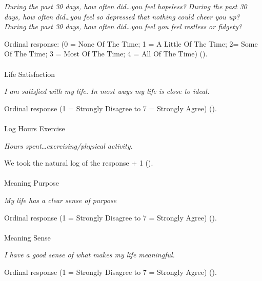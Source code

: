 \documentclass[
  single column]{article}
\makeatletter
\let\oldparagraph\paragraph
\renewcommand{\paragraph}{
    \@ifstar
      \xxxParagraphStar
      \xxxParagraphNoStar
  }
\newcommand{\xxxParagraphStar}[1]{\oldparagraph*{#1}\mbox{}}
\newcommand{\xxxParagraphNoStar}[1]{\oldparagraph{#1}\mbox{}}
\makeatother
\begin{document}
\emph{During the past 30 days, how often did\ldots you feel hopeless?}
\emph{During the past 30 days, how often did\ldots you feel so depressed
that nothing could cheer you up?} \emph{During the past 30 days, how
often did\ldots you feel you feel restless or fidgety?}

Ordinal response: (0 = None Of The Time; 1 = A Little Of The Time; 2=
Some Of The Time; 3 = Most Of The Time; 4 = All Of The Time)
().

\paragraph{Life Satisfaction}\label{life-satisfaction-1}

\emph{I am satisfied with my life.} \emph{In most ways my life is close
to ideal.}

Ordinal response (1 = Strongly Disagree to 7 = Strongly Agree)
().

\paragraph{Log Hours Exercise}\label{log-hours-exercise}

\emph{Hours spent\ldots exercising/physical activity.}

We took the natural log of the response + 1
().

\paragraph{Meaning Purpose}\label{meaning-purpose}

\emph{My life has a clear sense of purpose}

Ordinal response (1 = Strongly Disagree to 7 = Strongly Agree)
().

\paragraph{Meaning Sense}\label{meaning-sense}

\emph{I have a good sense of what makes my life meaningful.}

Ordinal response (1 = Strongly Disagree to 7 = Strongly Agree)
().
\end{document}
